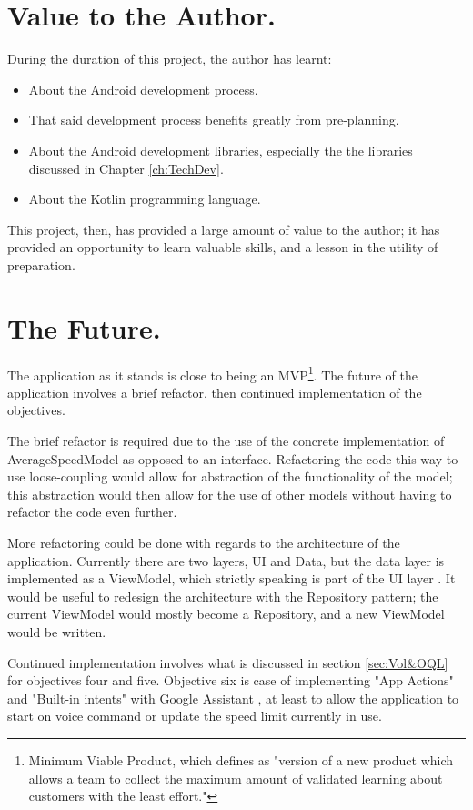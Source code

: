\documentclass[11pt, a4paper, notitlepage]{report}
\begin{document}
\section{Value to the Author.}
During the duration of this project, the author has learnt:
\begin{itemize}
	\item About the Android development process.
	\item That said development process benefits greatly from pre-planning.
	\item About the Android development libraries, especially the the libraries discussed in Chapter \ref{ch:TechDev}.
	\item About the Kotlin programming language.
\end{itemize}
This project, then, has provided a large amount of value to the author; it has provided an opportunity to learn valuable skills, and a lesson in the utility of preparation.

\section{The Future.}
The application as it stands is close to being an MVP\footnote{Minimum Viable Product, which \citet{mvpAGuide} defines as "version of a new product which allows a team to collect the maximum amount of validated learning about customers with the least effort."}. The future of the application involves a brief refactor, then continued implementation of the objectives.

The brief refactor is required due to the use of the concrete implementation of AverageSpeedModel as opposed to an interface. Refactoring the code this way to use loose-coupling would allow for abstraction of the functionality of the model; this abstraction would then allow for the use of other models without having to refactor the code even further.

More refactoring could be done with regards to the architecture of the application. Currently there are two layers, UI and Data, but the data layer is implemented as a ViewModel, which strictly speaking is part of the UI layer \citep{UILayerAndroid}. It would be useful to redesign the architecture with the Repository pattern; the current ViewModel would mostly become a Repository, and a new ViewModel would be written.

Continued implementation involves what is discussed in section \ref{sec:Vol&OQL} for objectives four and five. Objective six is case of implementing "App Actions" and "Built-in intents" with Google Assistant \citep{appActionsBII}, at least to allow the application to start on voice command or update the speed limit currently in use.
\end{document}
